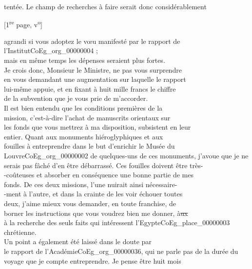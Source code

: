 \documentclass{book}
\begin{document}
tentée. Le champ de recherches à faire serait donc considérablement\\
{\footnotesize \begin{center} {[1\textsuperscript{re} page, v\textsuperscript{o}]}\end{center}}
\noindent agrandi si vous adoptez le vœu manifesté par le rapport de l’Institut\gls{CoEg_org_00000004} ;\\
mais en même temps les dépenses seraient plus fortes.\\
\indent Je crois donc, Monsieur le Ministre, ne pas vous surprendre\\
en vous demandant une augmentation sur laquelle le rapport\\
lui-même appuie, et en fixant à huit mille francs le chiffre\\
de la subvention que je vous prie de m’accorder.\\
\indent Il est bien entendu que les conditions premières de la\\
mission, c’est-à-dire l’achat de manuscrits orientaux sur\\
les fonds que vous mettrez à ma disposition, subsistent en leur\\
entier. Quant aux monuments hiéroglyphiques et aux\\
fouilles à entreprendre dans le but d’enrichir le Musée du\\
Louvre\gls{CoEg_org_00000002} de quelques-uns de ces monuments, j’avoue que je ne\\
serais pas fâché d’en être débarrassé. Ces fouilles doivent être très-\\
-coûteuses et absorber en conséquence une bonne partie de mes\\
fonds. De ces deux missions, l’une nuirait ainsi nécessaire-\\
-ment à l’autre, et dans la crainte de les voir échouer toutes\\
deux, j’aime mieux vous demander, en toute franchise, de\\
borner les instructions que vous voudrez bien me donner, à\sout{ux}\\
à la recherche des seuls faits qui intéressent l’Egypte\gls{CoEg_place_00000003} chrétienne.\\
\indent Un point a également été laissé dans le doute par\\
le rapport de l’Académie\gls{CoEg_org_00000036}, qui ne parle pas de la durée du\\
voyage que je compte entreprendre. Je pense être huit mois\\
\end{document}
